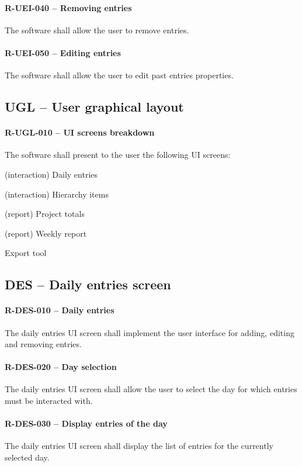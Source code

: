 \paragraph{R-UEI-040 -- Removing entries}
The software shall allow the user to remove entries.

\paragraph{R-UEI-050 -- Editing entries}
The software shall allow the user to edit past entries properties.

\subsection{UGL -- User graphical layout}
\paragraph{R-UGL-010 -- UI screens breakdown}
The software shall present to the user the following UI screens:

\begin{compactitem}
\item (interaction) Daily entries
\item (interaction) Hierarchy items
\item (report) Project totals
\item (report) Weekly report
\item Export tool
\end{compactitem}

\subsection{DES -- Daily entries screen}
\paragraph{R-DES-010 -- Daily entries}
The daily entries UI screen shall implement the user interface for adding,
editing and removing entries.

\paragraph{R-DES-020 -- Day selection}
The daily entries UI screen shall allow the user to select the day for which
entries must be interacted with.

\paragraph{R-DES-030 -- Display entries of the day}
The daily entries UI screen shall display the list of entries for the currently
selected day.

